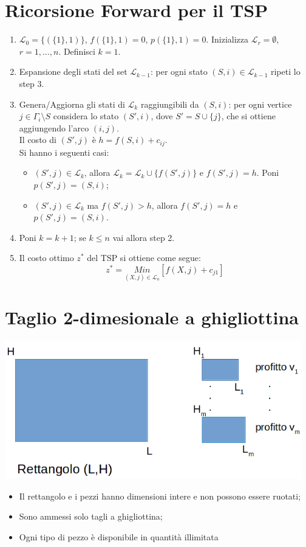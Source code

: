 \section{Ricorsione Forward per il TSP}
\begin{enumerate}
	\item $\mathscr{L}_{0}=\{(\{1\},1)\}$, $f(\{1\},1)=0$, $p(\{1\},1)=0$. Inizializza $\mathscr{L}_{r}=\emptyset$, $r=1,\dots,n$. Definisci $k=1$.
	\item Espansione degli stati del set $\mathscr{L}_{k-1}$: per ogni stato $(S,i)\in\mathscr{L}_{k-1}$ ripeti lo step 3.
	\item Genera/Aggiorna gli stati di $\mathscr{L}_{k}$ raggiungibili da $(S,i)$: per ogni vertice $j\in\Gamma_{i}\setminus S$ considera lo stato $(S',i)$, dove $S'=S\cup\{j\}$, che si ottiene aggiungendo l'arco $(i,j)$.\\
	Il costo di $(S',j)$ è $h=f(S,i)+c_{ij}$.\\
	Si hanno i seguenti casi:
	\begin{itemize}
		\item $(S',j)\in\mathscr{L}_{k}$, allora $\mathscr{L}_{k}=\mathscr{L}_{k}\cup \{f(S',j)\}$ e $f(S',j)=h$. Poni $p(S',j)=(S,i)$;
		\item $(S',j)\in\mathscr{L}_{k}$ ma $f(S',j)>h$, allora $f(S',j)=h$ e $p(S',j)=(S,i)$.
	\end{itemize}
	\item Poni $k=k+1$; se $k\le n$ vai allora step 2.
	\item Il costo ottimo $z^{*}$ del TSP si ottiene come segue:
	\begin{equation*}
		z^{*}=\underset{(X,j)\in\mathscr{L}_{n}}{Min}[f(X,j)+c_{j1}]
	\end{equation*}
\end{enumerate}

\section{Taglio 2-dimesionale a ghigliottina}
\centerline{\includegraphics[height=6cm]{images/shape1.png}}
\begin{itemize}
	\item Il rettangolo e i pezzi hanno dimensioni intere e non possono essere ruotati;
	\item Sono ammessi solo tagli a ghigliottina;
	\item Ogni tipo di pezzo è disponibile in quantità illimitata
\end{itemize}

